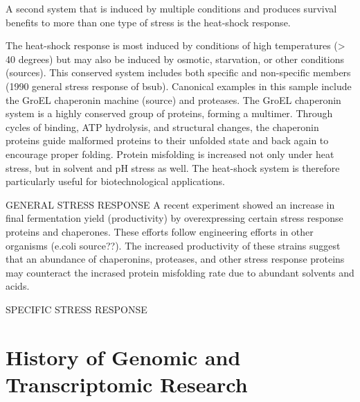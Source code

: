 A second system that is induced by multiple conditions and produces survival benefits to more than one type of stress is the heat-shock response. 

The heat-shock response is most induced by conditions of high temperatures (> 40 degrees) but may also be induced by osmotic, starvation, or other conditions (sources). This conserved system includes both specific and non-specific members (1990 general stress response of bsub). Canonical examples in this sample include the GroEL chaperonin machine (source) and proteases. The GroEL chaperonin system is a highly conserved group of proteins, forming a multimer. Through cycles of binding, ATP hydrolysis, and structural changes, the chaperonin proteins guide malformed proteins to their unfolded state and back again to encourage proper folding. Protein misfolding is increased not only under heat stress, but in solvent and pH stress as well. The heat-shock system is therefore particularly useful for biotechnological applications.




GENERAL STRESS RESPONSE
A recent experiment showed an increase in final fermentation yield (productivity) by overexpressing certain stress response proteins and chaperones. These efforts follow engineering efforts in other organisms (e.coli source??). The increased productivity of these strains suggest that an abundance of chaperonins, proteases, and other stress response proteins may counteract the incrased protein misfolding rate due to abundant solvents and acids.


SPECIFIC STRESS RESPONSE


\section{History of Genomic and Transcriptomic Research}
